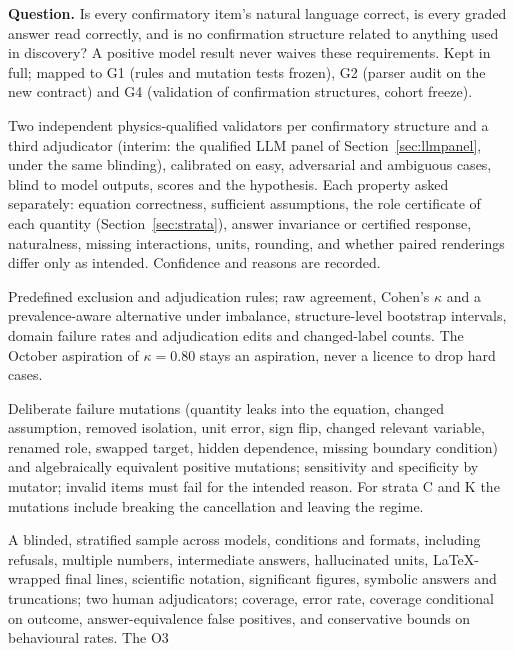 \documentclass[10pt,a4paper]{article}
\begin{document}
\textbf{Question.} Is every confirmatory item's natural language correct, is every graded answer read correctly,
and is no confirmation structure related to anything used in discovery? A positive model result never waives these
requirements. Kept in full; mapped to G1 (rules and mutation tests frozen), G2 (parser audit on the new contract)
and G4 (validation of confirmation structures, cohort freeze).

\begin{description}[leftmargin=1.2em,style=nextline]
\item[P3.1 Personnel and blinding.] Two independent physics-qualified validators per confirmatory structure and a
third adjudicator (interim: the qualified LLM panel of Section~\ref{sec:llmpanel}, under the same blinding), calibrated on easy, adversarial and ambiguous cases, blind to model outputs, scores and the
hypothesis. Each property asked separately: equation correctness, sufficient assumptions, the role certificate of
each quantity (Section~\ref{sec:strata}), answer invariance or certified response, naturalness, missing
interactions, units, rounding, and whether paired renderings differ only as intended. Confidence and reasons are
recorded.
\item[P3.2 Disagreement.] Predefined exclusion and adjudication rules; raw agreement, Cohen's $\kappa$ and a
prevalence-aware alternative under imbalance, structure-level bootstrap intervals, domain failure rates and
adjudication edits and changed-label counts. The October aspiration of $\kappa=0.80$ stays an aspiration, never a
licence to drop hard cases.
\item[P3.3 Mutational verification.] Deliberate failure mutations (quantity leaks into the equation, changed
assumption, removed isolation, unit error, sign flip, changed relevant variable, renamed role, swapped target, hidden dependence, missing
boundary condition) and algebraically equivalent positive mutations; sensitivity and specificity by mutator; invalid
items must fail for the intended reason. For strata C and K the mutations include breaking the cancellation and
leaving the regime.
\item[P3.4 Parser study.] A blinded, stratified sample across models, conditions and formats, including refusals,
multiple numbers, intermediate answers, hallucinated units, LaTeX-wrapped final lines, scientific notation,
significant figures, symbolic answers and truncations; two human adjudicators; coverage, error rate, coverage
conditional on outcome, answer-equivalence false positives, and conservative bounds on behavioural rates. The O3

\end{description}
\end{document}
